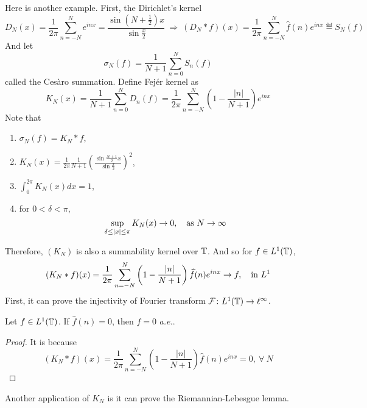 \begin{enumerate}[label=\arabic*.]
	\noindent Here is another example. First, the Dirichlet's kernel
	\begin{equation*}
		D_N(x) = \frac{1}{2\pi}\sum_{n = -N}^Ne^{inx} = \frac{\sin \left(N+\frac{1}{2}\right) x}{\sin \frac{x}{2}}~ \Rightarrow~(D_N * f)(x) = \frac{1}{2\pi}\sum_{n = -N}^N \widehat{f}(n)e^{inx} \eqdef S_N(f)
	\end{equation*}
	And let
	\begin{equation*}
		\sigma_N(f) = \frac{1}{N+1}\sum_{n=0}^N S_n(f)
	\end{equation*}
	called the Ces\`aro summation. Define Fej\'er kernel as
	\begin{equation*}
		K_N(x) =  \frac{1}{N+1}\sum_{n=0}^N D_n(f) = \frac{1}{2\pi}\sum_{n = -N}^N \left(1-\frac{|n|}{N+1}\right) e^{i n x}
	\end{equation*}
	Note that
	\begin{enumerate}[label=(\roman*)]
		\item $\sigma_N(f)=K_N * f$,
		\item $K_N(x)=\frac{1}{2\pi}\frac{1}{N+1}\left(\frac{\sin \frac{N+1}{2} x}{\sin \frac{x}{2}}\right)^2$,
		\item $\int_{0}^{2\pi} K_N(x) d x=1$,
		\item for $0 < \delta < \pi$, 
		\begin{equation*}
			\sup _{\delta \leq|x| \leq \pi} K_N(x) \rightarrow 0,\quad \text{as } N \rightarrow \infty
		\end{equation*}
	\end{enumerate}
	Therefore, $(K_N)$ is also a summability kernel over $\mathbb{T}$. And so for $f \in L^1(\mathbb{T})$,
	\begin{equation*}
		(K_N * f)(x) = \frac{1}{2\pi}\sum_{n=-N}^N\left(1-\frac{|n|}{N+1}\right) \widehat{f}(n) e^{i n x} \rightarrow f,\quad \text{in }L^1
	\end{equation*}
	First, it can prove the injectivity of Fourier transform $\mathcal{F} \colon L^1(\mathbb{T}) \rightarrow \ell^\infty$.
	\begin{cor}
		Let $f \in L^1(\mathbb{T})$. If $\widehat{f}(n) = 0$, then $f = 0$ \emph{a.e.}.
	\end{cor}
	\begin{proof}
		It is because
		\begin{equation*}
			(K_N * f)(x) = \frac{1}{2\pi}\sum_{n=-N}^N\left(1-\frac{|n|}{N+1}\right) \widehat{f}(n) e^{i n x}  = 0,~\forall~N
		\end{equation*}
	\end{proof}
	Another application of $K_N$ is it can prove the Riemannian-Lebesgue lemma.

\end{enumerate}
